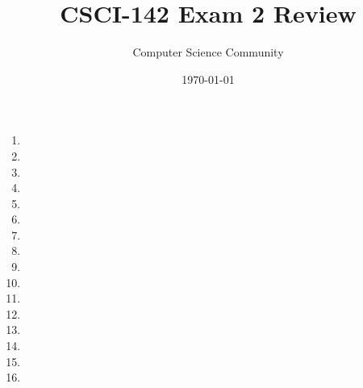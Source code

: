 \documentclass[11pt]{article}
\title{CSCI-142 Exam 2 Review}
\author{Computer Science Community}
\date{\today}
\begin{document}
\header
\begin{enumerate}

\item 

\item 

\item 

\item 

\item 

\item 

\newpage
\item 

\item 

\item 

\item 

\item 

\newpage
\item 

\item 

\item 

\newpage
\item 

\newpage
\item 

\end{enumerate}
\end{document}
